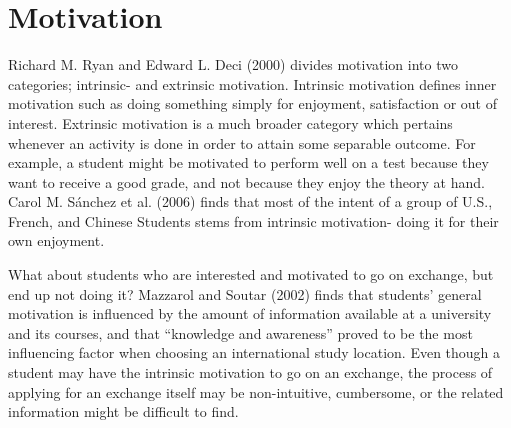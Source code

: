 \section{Motivation}
Richard M. Ryan and Edward L. Deci (2000)\cite{ryan2000intrinsic} divides motivation into two categories; intrinsic- and extrinsic motivation. Intrinsic motivation defines inner motivation such as doing something simply for enjoyment, satisfaction or out of interest. Extrinsic motivation is a much broader category which pertains whenever an activity is done in order to attain some separable outcome\cite{ryan2000intrinsic}. For example, a student might be motivated to perform well on a test because they want to receive a good grade, and not because they enjoy the theory at hand. Carol M. Sánchez et al. (2006)\cite{sanchez2006motivations} finds that most of the intent of a group of U.S., French, and Chinese Students stems from intrinsic motivation- doing it for their own enjoyment. 

What about students who are interested and motivated to go on exchange, but end up not doing it? Mazzarol and Soutar (2002)\cite{mazzarol2002push} finds that students' general motivation is influenced by the amount of information available at a university and its courses, and that \enquote{knowledge and awareness} proved to be the most influencing factor when choosing an international study location. Even though a student may have the intrinsic motivation to go on an exchange, the process of applying for an exchange itself may be non-intuitive, cumbersome, or the related information might be difficult to find. 


\cleardoublepage